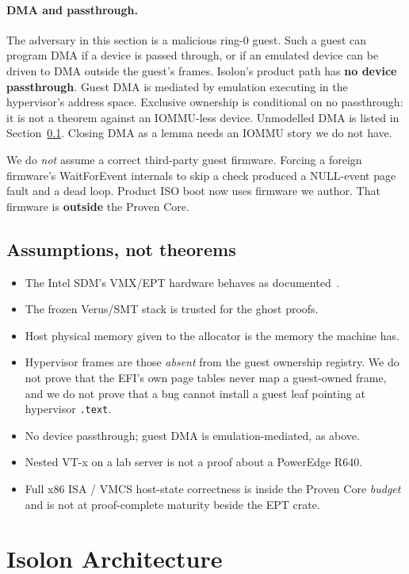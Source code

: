 \documentclass[sigplan,10pt,anonymous]{acmart}
\begin{document}
\paragraph{DMA and passthrough.}
The adversary in this section is a malicious ring-0 guest. Such a guest
can program DMA if a device is passed through, or if an emulated device can
be driven to DMA outside the guest's frames. Isolon's product path has
\textbf{no device passthrough}. Guest DMA is mediated by emulation executing
in the hypervisor's address space. Exclusive ownership is conditional on
no passthrough: it is not a theorem against an IOMMU-less device.
Unmodelled DMA is listed in Section~\ref{sec:assumptions}. Closing DMA as a
lemma needs an IOMMU story we do not have.

We do \emph{not} assume a correct third-party guest firmware. Forcing a
foreign firmware's WaitForEvent internals to skip a check produced a
NULL-event page fault and a dead loop. Product ISO boot now uses firmware we
author. That firmware is \textbf{outside} the Proven Core.

\subsection{Assumptions, not theorems}
\label{sec:assumptions}

\begin{itemize}
\item The Intel SDM's VMX/EPT hardware behaves as documented~\cite{intel-sdm}.
\item The frozen Verus/SMT stack is trusted for the ghost proofs.
\item Host physical memory given to the allocator is the memory the
  machine has.
\item Hypervisor frames are those \emph{absent} from the guest ownership
  registry. We do not prove that the EFI's own page tables never map a
  guest-owned frame, and we do not prove that a bug cannot install a guest
  leaf pointing at hypervisor \texttt{.text}.
\item No device passthrough; guest DMA is emulation-mediated, as above.
\item Nested VT-x on a lab server is not a proof about a PowerEdge R640.
\item Full x86 ISA / VMCS host-state correctness is inside the Proven Core
  \emph{budget} and is not at proof-complete maturity beside the EPT crate.
\end{itemize}

\section{Isolon Architecture}
\end{document}
